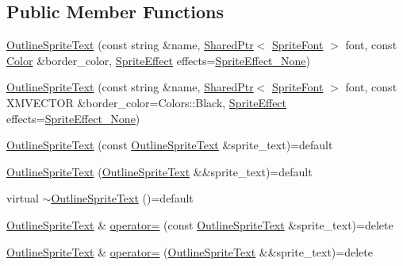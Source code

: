 \subsection*{Public Member Functions}
\begin{DoxyCompactItemize}
\item 
\hyperlink{classmage_1_1_outline_sprite_text_ade104685e447589ada4c15a0a0159ced}{Outline\+Sprite\+Text} (const string \&name, \hyperlink{namespacemage_a1e01ae66713838a7a67d30e44c67703e}{Shared\+Ptr}$<$ \hyperlink{classmage_1_1_sprite_font}{Sprite\+Font} $>$ font, const \hyperlink{structmage_1_1_color}{Color} \&border\+\_\+color, \hyperlink{namespacemage_a9cfe18123066ba4236f548f9de75d881}{Sprite\+Effect} effects=\hyperlink{namespacemage_a9cfe18123066ba4236f548f9de75d881af3c275fbfacfe174da928b2f24dfa515}{Sprite\+Effect\+\_\+\+None})
\item 
\hyperlink{classmage_1_1_outline_sprite_text_a3b121671ad6ddc82082a45fb1fcbb572}{Outline\+Sprite\+Text} (const string \&name, \hyperlink{namespacemage_a1e01ae66713838a7a67d30e44c67703e}{Shared\+Ptr}$<$ \hyperlink{classmage_1_1_sprite_font}{Sprite\+Font} $>$ font, const X\+M\+V\+E\+C\+T\+OR \&border\+\_\+color=Colors\+::\+Black, \hyperlink{namespacemage_a9cfe18123066ba4236f548f9de75d881}{Sprite\+Effect} effects=\hyperlink{namespacemage_a9cfe18123066ba4236f548f9de75d881af3c275fbfacfe174da928b2f24dfa515}{Sprite\+Effect\+\_\+\+None})
\item 
\hyperlink{classmage_1_1_outline_sprite_text_afc6f74389320a27993e64c288aa792cc}{Outline\+Sprite\+Text} (const \hyperlink{classmage_1_1_outline_sprite_text}{Outline\+Sprite\+Text} \&sprite\+\_\+text)=default
\item 
\hyperlink{classmage_1_1_outline_sprite_text_a91fce8258f2455d93426b91dce87e14f}{Outline\+Sprite\+Text} (\hyperlink{classmage_1_1_outline_sprite_text}{Outline\+Sprite\+Text} \&\&sprite\+\_\+text)=default
\item 
virtual \hyperlink{classmage_1_1_outline_sprite_text_a13ab47f5f6ade5dc5076ebb127a24261}{$\sim$\+Outline\+Sprite\+Text} ()=default
\item 
\hyperlink{classmage_1_1_outline_sprite_text}{Outline\+Sprite\+Text} \& \hyperlink{classmage_1_1_outline_sprite_text_a324ec8e5c0d319b449895cc45d6b3807}{operator=} (const \hyperlink{classmage_1_1_outline_sprite_text}{Outline\+Sprite\+Text} \&sprite\+\_\+text)=delete
\item 
\hyperlink{classmage_1_1_outline_sprite_text}{Outline\+Sprite\+Text} \& \hyperlink{classmage_1_1_outline_sprite_text_a3549e97af5461728a399f01af9125486}{operator=} (\hyperlink{classmage_1_1_outline_sprite_text}{Outline\+Sprite\+Text} \&\&sprite\+\_\+text)=delete

\end{DoxyCompactItemize}
